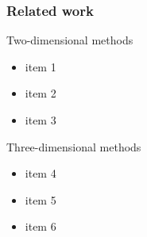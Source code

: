 \begin{frame}[<+(1)->]
\frametitle{Related work}

Two-dimensional methods

\begin{itemize}
\item item 1
\item item 2
\item item 3
\end{itemize}

Three-dimensional methods

\begin{itemize}
\item item 4
\item item 5
\item item 6
\end{itemize}

\end{frame}